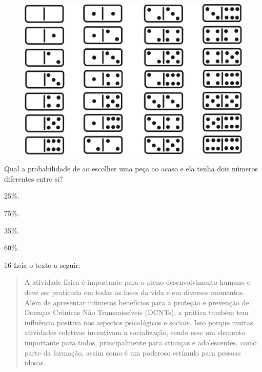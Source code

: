 \begin{figure}[htpb!]
\centering
\includegraphics[width=\textwidth]{./ilustras-mat/Simulado_4-atividade_15.png}
\end{figure}


Qual a probabilidade de ao escolher uma peça ao acaso e ela tenha dois
números diferentes entre si?

\begin{escolha}

\item
  25\%.
\item
  75\%.
\item
  35\%.
\item
  60\%.
\end{escolha}


\num{16} Leia o texto a seguir:

\begin{quote}
A atividade física é importante para o pleno desenvolvimento humano e
deve ser praticada em todas as fases da vida e em diversos momentos.
Além de apresentar inúmeros benefícios para a proteção e prevenção de
Doenças Crônicas Não Transmissíveis (DCNTs), a prática também tem
influência positiva nos aspectos psicológicos e sociais. Isso porque
muitas atividades coletivas incentivam a socialização, sendo esse um
elemento importante para todos, principalmente para crianças e
adolescentes, como parte da formação, assim como é um poderoso estímulo
para pessoas idosas.

\end{quote}

